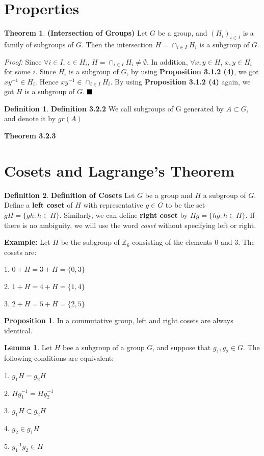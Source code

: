 \documentclass{article}
\theoremstyle{definition}
\newtheorem{defi}{Definition}[subsection]
\newtheorem{theorem}{Theorem}[subsection]
\newtheorem{prop}{Proposition}[subsection]
\newtheorem{lemma}{Lemma}[subsection]
\begin{document}
\section{Properties}

\begin{theorem}
\noindent\textbf{(Intersection of Groups)} Let $G$ be a group, and $(H_{i})_{i \in I}$ is a family of subgroups of $G$. Then the intersection $H = \cap_{i \in I}H_{i}$ is a subgroup of $G$.
\end{theorem}
\textit{Proof:} Since $\forall i \in I$, $e \in H_{i}$, $H=\cap_{i \in I}H_{i} \neq \emptyset$. In addition, $\forall x,y \in H$, $x,y \in H_{i}$ for some $i$. Since $H_{i}$ is a subgroup of $G$, by using \textbf{Proposition 3.1.2 (4)}, we got $xy^{-1} \in H_{i}$. Hence $xy^{-1} \in \cap_{i \in I}H_{i}$. By using \textbf{Proposition 3.1.2 (4)} again, we got $H$ is a subgroup of $G$. $\hfill\blacksquare$

\begin{defi}
\noindent\textbf{Definition 3.2.2} We call subgroups of G generated by $A \subset G$, and denote it by $gr(A)$
\end{defi}


\noindent\textbf{Theorem 3.2.3}

\section{Cosets and Lagrange's Theorem}

\begin{defi}
\textbf{Definition of Cosets} Let $G$ be a group and $H$ a subgroup of $G$. Define a \textbf{left coset} of $H$ with representative $g \in G$ to be the set $gH=\{gh: h \in H\}$. Similarly, we can define \textbf{right coset} by $Hg = \{hg: h\in H\}$. If there is no ambiguity, we will use the word \textit{coset} without specifying left or right.

\noindent\textbf{Example:} Let $H$ be the subgroup of $\mathbb{Z}_6$ consisting of the elements $0$ and $3$. The cosets are:
\end{defi}
1. $0+H=3+H=\{0,3\}$

2. $1+H=4+H=\{1,4\}$

3. $2+H=5+H=\{2,5\}$

\begin{prop}
In a commutative group, left and right cosets are always identical.
\end{prop}

\begin{lemma}
Let $H$ bee a subgroup of a group $G$, and suppose that $g_1,g_2 \in G$. The following conditions are equivalent:

1. $g_1H=g_2H$

2. $Hg_{1}^{-1}=Hg_{2}^{-1}$

3. $g_1H \subset g_2H$

4. $g_2 \in g_1H$

5. $g_1^{-1}g_2 \in H$
\end{lemma}
\end{document}
